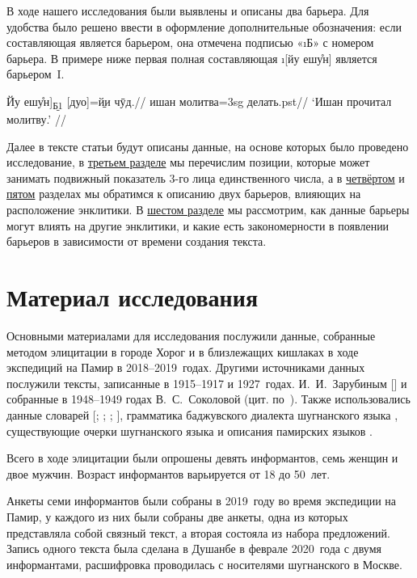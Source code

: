 В ходе нашего исследования были выявлены и описаны два барьера. Для удобства было решено ввести в оформление дополнительные обозначения: если составляющая является барьером, она отмечена подписью «\i{Б}» с номером барьера. В примере ниже первая полная составляющая \i{{[}йу ешу̊н{]}} является барьером~I.

\begingl
\gla {[}Йу ешу̊н{]}\textsubscript{\b{Б1}} {[}дуо{]}=\b{йи} чӯд.//
 ишан молитва={\sc 3sg} делать.{\sc pst}//
\glft ‘Ишан прочитал молитву.’ //
\endgl \xe

Далее в тексте статьи будут описаны данные, на основе которых было проведено исследование, в \hyperref[clit-position]{третьем разделе} мы перечислим позиции, которые может занимать подвижный показатель 3-го лица единственного числа, а в \hyperref[clit-barone]{четвёртом} и \hyperref[clit-bartwo]{пятом} разделах мы обратимся к описанию двух барьеров, влияющих на расположение энклитики. В \hyperref[clit-distrib]{шестом разделе} мы рассмотрим, как данные барьеры могут влиять на другие энклитики, и какие есть закономерности в появлении барьеров в зависимости от времени создания текста.

\section{Материал исследования} \label{clit-data}

Основными материалами для исследования послужили данные, собранные методом элицитации в городе Хорог и в близлежащих кишлаках в ходе экспедиций на Памир в 2018–2019~годах. Другими источниками данных послужили тексты, записанные в 1915–1917 и 1927~годах. И.~И.~Зарубиным [\cite*{zarubin1960}] и собранные в 1948–1949 годах В.~С.~Соколовой (цит. по~\parencite{pakhalina1969_pamir}). Также использовались данные словарей [\cite{karamshoev1988}; \cite*{karamshoev1991}; \cite*{karamshoev1999}; \cite{zarubin1960}], грамматика баджувского диалекта шугнанского языка \parencite{karamshoev1963}, существующие очерки шугнанского языка и описания памирских языков \parencites{edelman_yusufbekov1999_shughni}{edelman_dodykhudoeva2009_shughni}{pakhalina1969_pamir}{bakhtibekov1979}.

Всего в ходе элицитации были опрошены девять информантов, семь женщин и двое мужчин. Возраст информантов варьируется от 18 до 50~лет.

Анкеты семи информантов были собраны в 2019~году во время экспедиции на Памир, у каждого из них были собраны две анкеты, одна из которых представляла собой связный текст, а вторая состояла из набора предложений. Запись одного текста была сделана в Душанбе в феврале 2020~года с двумя информантами, расшифровка проводилась с носителями шугнанского в Москве.

